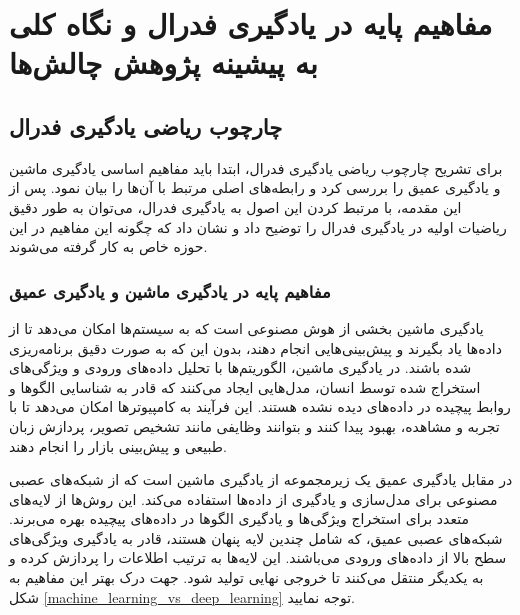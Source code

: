 \chapter{مفاهیم پایه در یادگیری فدرال و نگاه کلی به پیشینه پژوهش چالش‌ها}

\section{چارچوب ریاضی یادگیری فدرال}
برای تشریح چارچوب ریاضی یادگیری فدرال، ابتدا باید مفاهیم اساسی یادگیری ماشین و یادگیری عمیق را بررسی کرد و رابطه‌های اصلی مرتبط با آن‌ها را بیان نمود. پس از این مقدمه، با مرتبط کردن این اصول به یادگیری فدرال، می‌توان به طور دقیق ریاضیات اولیه در یادگیری فدرال را توضیح داد و نشان داد که چگونه این مفاهیم در این حوزه خاص به کار گرفته می‌شوند.

\subsection{مفاهیم پایه در یادگیری ماشین و یادگیری عمیق}
یادگیری ماشین بخشی از هوش مصنوعی است که به سیستم‌ها امکان می‌دهد تا از داده‌ها یاد بگیرند و پیش‌بینی‌هایی انجام دهند، بدون این که به صورت دقیق برنامه‌ریزی شده باشند. در یادگیری ماشین، الگوریتم‌ها با تحلیل داده‌های ورودی و ویژگی‌های استخراج شده توسط انسان، مدل‌هایی ایجاد می‌کنند که قادر به شناسایی الگوها و روابط پیچیده در داده‌های دیده نشده هستند. این فرآیند به کامپیوترها امکان می‌دهد تا با تجربه و مشاهده، بهبود پیدا کنند و بتوانند وظایفی مانند تشخیص تصویر، پردازش زبان طبیعی و پیش‌بینی بازار را انجام دهند.

در مقابل یادگیری عمیق یک زیرمجموعه از یادگیری ماشین است که از شبکه‌های عصبی مصنوعی برای مدل‌سازی و یادگیری از داده‌ها استفاده می‌کند. این روش‌ها از لایه‌های متعدد برای استخراج ویژگی‌ها و یادگیری الگوها در داده‌های پیچیده بهره می‌برند. شبکه‌های عصبی عمیق، که شامل چندین لایه پنهان%
هستند، قادر به یادگیری ویژگی‌های سطح بالا از داده‌های ورودی می‌باشند. این لایه‌ها به ترتیب اطلاعات را پردازش کرده و به یکدیگر منتقل می‌کنند تا خروجی نهایی تولید شود. جهت درک بهتر این مفاهیم به شکل
\ref{machine_learning_vs_deep_learning}
توجه نمایید.


